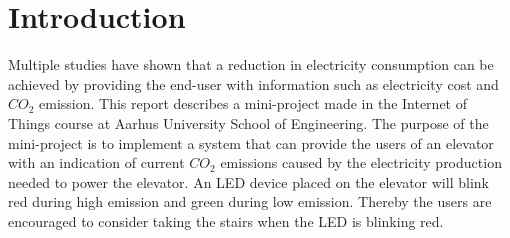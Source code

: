 \documentclass[Main]{subfiles}
\begin{document}
\section{Introduction} %
\label{sec:introduction}
Multiple studies have shown that a reduction in electricity consumption can be achieved by providing the end-user with information such as electricity cost and $CO_2$ emission\cite{Tricascade:2009:Online}. 
This report describes a mini-project made in the Internet of Things course at Aarhus University School of Engineering. 
The purpose of the mini-project is to implement a system that can provide the users of an elevator with an indication of current $CO_2$ emissions caused by the electricity production needed to power the elevator. 
An LED device placed on the elevator will blink red during high emission and green during low emission. 
Thereby the users are encouraged to consider taking the stairs when the LED is blinking red. 






\end{document}
